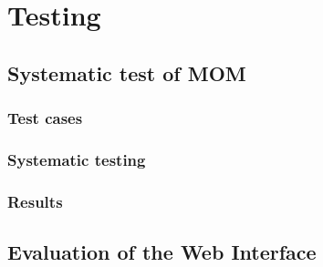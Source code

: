 \chapter{Testing}

\section{Systematic test of MOM}
\subsection{Test cases}
\subsection{Systematic testing}
\subsection{Results}

\section{Evaluation of the Web Interface}%